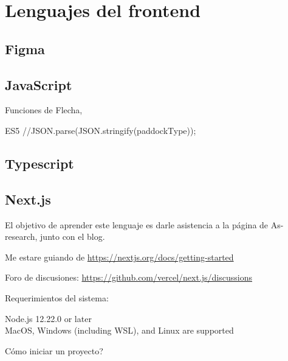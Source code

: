 \part{Lenguajes del frontend}

\chapter{Figma}

\chapter{JavaScript}


Funciones de Flecha, 

ES5 //JSON.parse(JSON.stringify(paddockType));

\chapter{Typescript}

\chapter{Next.js}

El objetivo de aprender este lenguaje es darle asistencia a la p\'agina de As-research, junto con el blog. 

Me estare guiando de \url{https://nextjs.org/docs/getting-started}

Foro de discusiones: \url{https://github.com/vercel/next.js/discussions}

Requerimientos del sistema: 

Node.js 12.22.0 or later\\
MacOS, Windows (including WSL), and Linux are supported


C\'omo iniciar un proyecto?



